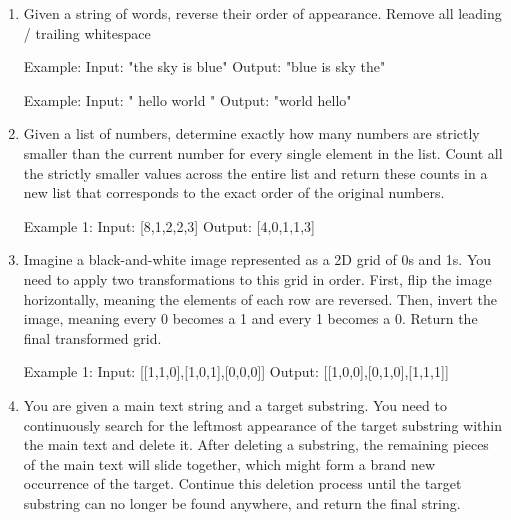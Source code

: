 \begin{enumerate}
\begin{consolethree}
Example 2:
Input: num1 = "123", num2 = "456"
Output: "56088"
\end{consolethree}
\newpage


\item
  Given a string of words, reverse their order of appearance.
Remove all leading / trailing whitespace
\begin{consolethree}
Example:
Input: "the sky is blue" 
Output: "blue is sky the"

Example:
Input: "  hello world  " 
Output: "world hello" 
\end{consolethree}
\newpage


\item
Given a list of numbers, determine exactly how many numbers are strictly smaller than the current number for every single element in the list.
Count all the strictly smaller values across the entire list and return these counts in a new list that corresponds to the exact order of the original numbers.

\begin{consolethree}
Example 1:
Input: [8,1,2,2,3] 
Output: [4,0,1,1,3]
\end{consolethree}
\newpage


\item
Imagine a black-and-white image represented as a 2D grid of 0s and 1s. You need to apply two transformations to this grid in order.
First, flip the image horizontally, meaning the elements of each row are reversed. Then, invert the image, meaning every 0 becomes a 1 and every 1 becomes a 0. Return the final transformed grid.

\begin{consolethree}
Example 1:
Input: [[1,1,0],[1,0,1],[0,0,0]] 
Output: [[1,0,0],[0,1,0],[1,1,1]]
\end{consolethree}
\newpage


\item
You are given a main text string and a target substring. You need to continuously search for the leftmost appearance of the target substring within the main text and delete it.
After deleting a substring, the remaining pieces of the main text will slide together, which might form a brand new occurrence of the target. Continue this deletion process until the target substring can no longer be found anywhere, and return the final string.


\end{enumerate}
